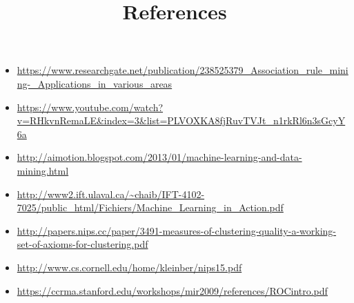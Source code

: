 \documentclass{article}
\begin{document}
\begin{center}
\title{References}
\begin{itemize}
\item \url{https://www.researchgate.net/publication/238525379_Association_rule_mining-_Applications_in_various_areas}
\item \url{https://www.youtube.com/watch?v=RHkvnRemaLE&index=3&list=PLVOXKA8fjRuvTVJt_n1rkRl6n3sGcyY6a}
\item \url{http://aimotion.blogspot.com/2013/01/machine-learning-and-data-mining.html}
\item \url{http://www2.ift.ulaval.ca/~chaib/IFT-4102-7025/public_html/Fichiers/Machine_Learning_in_Action.pdf}
\item \url{http://papers.nips.cc/paper/3491-measures-of-clustering-quality-a-working-set-of-axioms-for-clustering.pdf}
\item \url{http://www.cs.cornell.edu/home/kleinber/nips15.pdf}
\item \url{https://ccrma.stanford.edu/workshops/mir2009/references/ROCintro.pdf}
\end{itemize}
\end{center}
\clearpage

\end{document}
